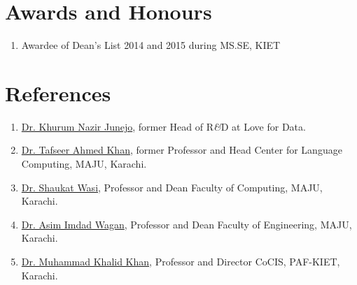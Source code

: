 \documentclass[10pt]{article}
\begin{document}
\section*{\textcolor{NavyBlue}{Awards and Honours}}
\begin{enumerate}
\itemsep=-.25em
\item Awardee of Dean's List 2014 and 2015 during MS.SE, KIET
\end{enumerate}

\section*{\textcolor{NavyBlue}{References}}
\begin{enumerate}
\itemsep=-.25em
\item \href{https://www.linkedin.com/in/knjunejo/}{Dr. Khurum Nazir Junejo}, former Head of R\emph{\&}D at Love for Data.
\item \href{https://www.linkedin.com/in/tafseer-ahmed-8231a22/}{Dr. Tafseer Ahmed Khan}, former Professor and Head Center for Language Computing, MAJU, Karachi.
\item \href{https://www.linkedin.com/in/shaukatwasi/}{Dr. Shaukat Wasi}, Professor and Dean Faculty of Computing, MAJU, Karachi.
\item \href{https://www.linkedin.com/in/aiwagan/}{Dr. Asim Imdad Wagan}, Professor and Dean Faculty of Engineering, MAJU, Karachi.
\item \href{https://www.linkedin.com/in/mkhalidkhan78/}{Dr. Muhammad Khalid Khan}, Professor and Director CoCIS, PAF-KIET, Karachi.
\end{enumerate}
\end{document}
